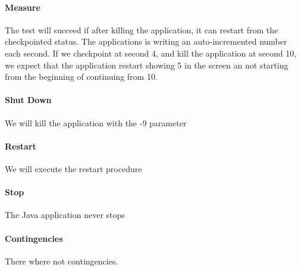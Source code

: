 \paragraph{Measure}
The test will succeed if after killing the application, it can restart from the checkpointed status. The applications is writing an 
auto-incremented number each second. If we checkpoint at second 4, and kill the application at second 10, we expect that the application
restart showing 5 in the screen an not starting from the beginning of continuing from 10.

\paragraph{Shut Down}
We will kill the application with the -9 parameter

\paragraph{Restart}
We will execute the restart procedure

\paragraph{Stop}
The Java application never stops


\paragraph{Contingencies}
There where not contingencies.
